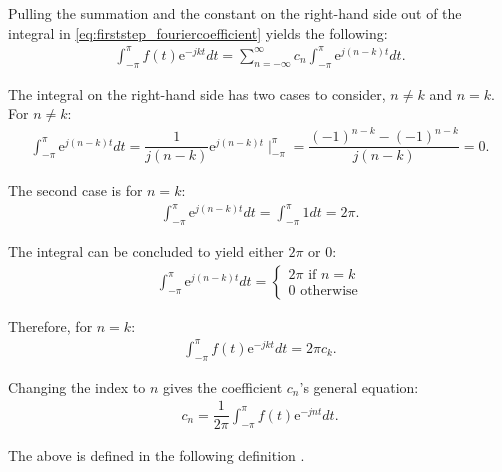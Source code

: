 Pulling the summation and the constant on the right-hand side out of the integral in \eqref{eq:firststep_fouriercoefficient} yields the following:
\begin{align*}
\int_{-\pi}^\pi f(t) \text{e}^{-j k t}dt = \sum_{n=-\infty}^\infty c_n \int_{-\pi}^\pi \text{e}^{j (n-k) t}dt.
\end{align*}

The integral on the right-hand side has two cases to consider, $n \neq k$ and $n = k$. For $n\neq k$:
\begin{align*}
	\int_{-\pi}^\pi \text{e}^{j(n-k)t}dt 
	=\dfrac{1}{j(n-k)}\text{e}^{j(n-k)t}\mid_{-\pi}^{\pi}
	=\dfrac{(-1)^{n-k}-(-1)^{n-k}}{j(n-k)}
	=0.
\end{align*}

The second case is for $n = k$:
\begin{align*}
\int_{-\pi}^\pi \text{e}^{j(n-k)t}dt = \int_{-\pi}^\pi 1 dt = 2\pi.
\end{align*}

The integral can be concluded to yield either $2\pi$ or $0$:
\begin{align}
	\int_{-\pi}^{\pi} \text{e}^{j (n-k)t}dt 
	= 
	\begin{cases}
			2\pi \text{ if } n=k\\
			0 \text{ otherwise}
	\end{cases}
\end{align}

Therefore, for $n = k$:
\begin{align*}
\int_{-\pi}^\pi f(t)\text{e}^{-j k t} dt = 2\pi c_k.
\end{align*}

Changing the index to $n$ gives the coefficient $c_n$'s general equation:
\begin{align*}
	c_n = \dfrac{1}{2\pi} \int_{-\pi}^{\pi} f(t) \text{e}^{-j n t}dt.
\end{align*}

The above is defined in the following definition \cite{page 18-20, FAA}.

